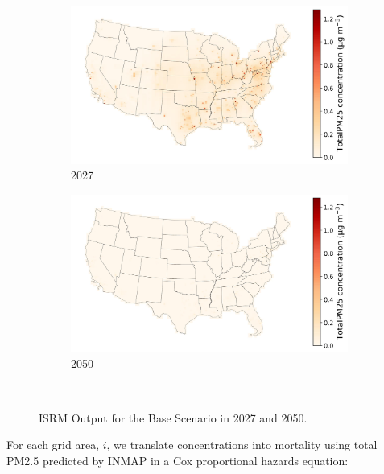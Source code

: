 \documentclass[a4paper]{article}
\theoremstyle{definition}
\theoremstyle{plain}
\begin{document}
\begin{figure}
    \centering
    \begin{subfigure}[b]{0.45\textwidth}
        \includegraphics[width=\textwidth]{Figures/Output/full-base-200/GenX/ISRM_2027_TotalPM25_concentrationmap.jpg}
        \caption{2027}
        \label{Subfig1}
    \end{subfigure}
    \hfill
    \begin{subfigure}[b]{0.45\textwidth}
        \includegraphics[width=\textwidth]{Figures/Output/full-base-200/GenX/ISRM_2050_TotalPM25_concentrationmap.jpg}
        \caption{2050}
        \label{Subfig2}
    \end{subfigure}\\
    \caption{ISRM Output for the Base Scenario in 2027 and 2050.}
    \label{ISRMexample}
\end{figure}
For each grid area, $i$, we translate concentrations into mortality using total PM2.5 predicted by INMAP in a Cox proportional hazards equation:
\end{document}
